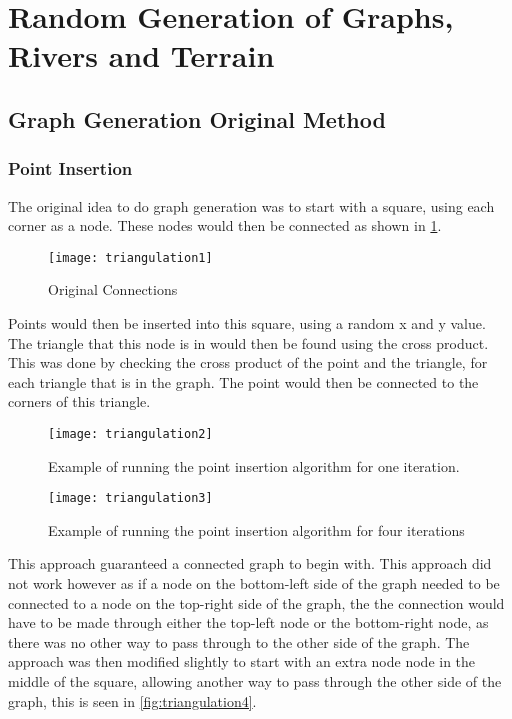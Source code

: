 \section{Random Generation of Graphs, Rivers and Terrain}

\subsection{Graph Generation Original Method}
\subsubsection{Point Insertion}
	The original idea to do graph generation was to start with a square, using each corner as a node. These nodes would then be connected as shown in \ref{fig:triangulation1}.\\

\begin{figure}[H]
	\texttt{[image: triangulation1]}
	\centering
	\caption{Original Connections}
	\label{fig:triangulation1}
\end{figure}

	Points would then be inserted into this square, using a random x and y value.  The triangle that this node is in would then be found using the cross product. This was done by checking the cross product of the point and the triangle, for each triangle that is in the graph. The point would then be connected to the corners of this triangle.\\

\begin{figure}[H]
	\texttt{[image: triangulation2]}
	\centering
	\caption{Example of running the point insertion algorithm for one iteration.}
	\label{fig:triangulation2}
\end{figure}

\begin{figure}[H]
	\texttt{[image: triangulation3]}
	\centering
	\caption{Example of running the point insertion algorithm for four iterations}
	\label{fig:triangulation3}
\end{figure}

	This approach guaranteed a connected graph to begin with. This approach did not work however as if a node on the bottom-left side of the graph needed to be connected to a node on the top-right side of the graph, the the connection would have to be made through either the top-left node or the bottom-right node, as there was no other way to pass through to the other side of the graph. The approach was then modified slightly to start with an extra node node in the middle of the square, allowing another way to pass through the other side of the graph, this is seen in \ref{fig:triangulation4}.

